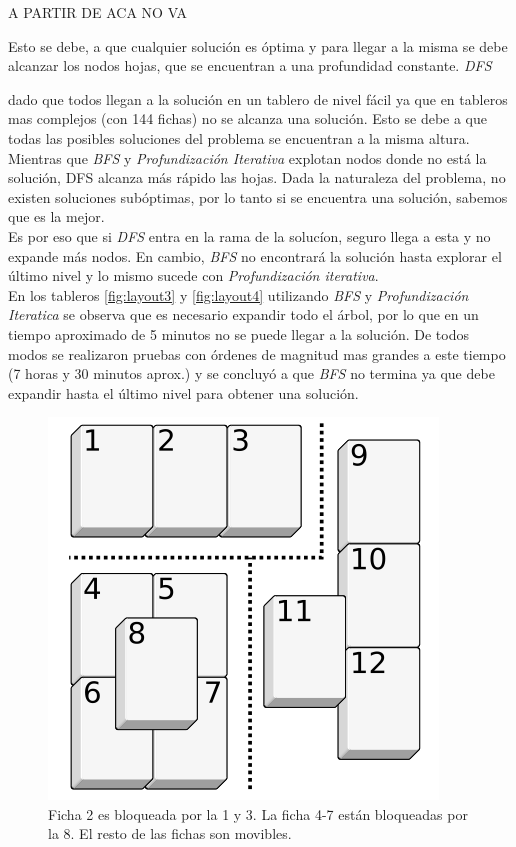 \documentclass{sig-alternate}
\begin{document}
A PARTIR DE ACA NO VA

Esto se debe, a que cualquier soluci\'on es \'optima y para llegar a la misma se debe alcanzar los nodos hojas, que se encuentran a una profundidad constante. \emph{DFS} 


 dado que todos llegan a la soluci\'on en un tablero de nivel f\'acil ya que en tableros mas complejos (con 144 fichas) no se alcanza una soluci\'on. Esto se debe a que todas las posibles soluciones del problema se encuentran a la misma altura. Mientras que \emph{BFS} y \emph{Profundizaci\'on Iterativa} explotan nodos donde no est\'a la soluci\'on, DFS alcanza m\'as r\'apido las hojas. Dada la naturaleza del problema, no existen soluciones sub\'optimas, por lo tanto si se encuentra una soluci\'on, sabemos que es la mejor.\\
 Es por eso que si \emph{DFS} entra en la rama de la soluc\'ion, seguro llega a esta y no expande m\'as nodos. En cambio, \emph{BFS} no encontrar\'a la soluci\'on hasta explorar el \'ultimo nivel y lo mismo sucede con \emph{Profundizaci\'on iterativa}. \\
En los tableros \ref{fig:layout3} y \ref{fig:layout4} utilizando \emph{BFS} y \emph{Profundizaci\'on Iteratica} se observa que es necesario expandir todo el \'arbol, por lo que en un tiempo aproximado de 5 minutos no se puede llegar a la soluci\'on. De todos modos se realizaron pruebas con \'ordenes de magnitud mas grandes a este tiempo (7 horas y 30 minutos aprox.) y se concluy\'o a que \emph{BFS} no termina ya que debe expandir hasta el \'ultimo nivel para obtener una soluci\'on.

\onecolumn

\begin{figure}[h!]
  \begin{center}
  	\includegraphics[scale=0.3]{images/blocking.png}
  \end{center}
  \caption{Ficha 2 es bloqueada por la 1 y 3. La ficha 4-7 est\'an bloqueadas por la 8. El resto de las fichas son movibles.}
  \label{fig:blocking}
\end{figure}
\end{document}
